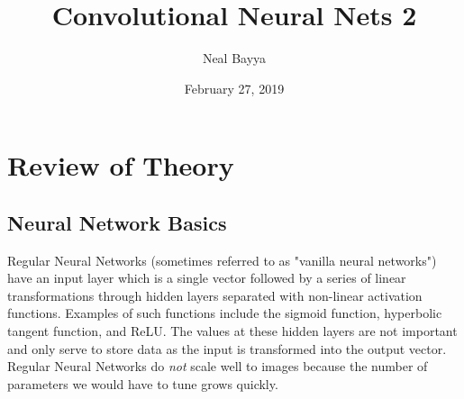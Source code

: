\documentclass[11pt]{article}
\title{Convolutional Neural Nets 2}
\author{Neal Bayya}
\date{February 27, 2019}
\begin{document}
\maketitle

\section{Review of Theory}
\subsection{Neural Network Basics}
Regular Neural Networks (sometimes referred to as "vanilla neural networks") have an input layer which is a single vector followed by a series of linear transformations through hidden layers separated with non-linear activation functions. Examples of such functions include the sigmoid function, hyperbolic tangent function, and ReLU. The values at these hidden layers are not important and only serve to store data as the input is transformed into the output vector. Regular Neural Networks do \textit{not} scale well to images because the number of parameters we would have to tune grows quickly. 
\end{document}
